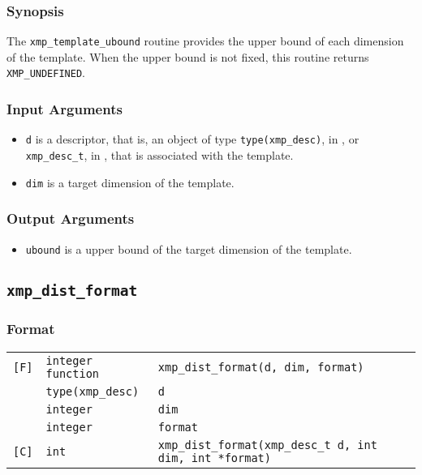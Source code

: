 \subsubsection*{Synopsis}

The {\tt xmp\_template\_ubound} routine provides the upper bound of each dimension of the template.
  When the upper bound is not fixed, this routine returns {\tt XMP\_UNDEFINED}.

\subsubsection*{Input Arguments}
\begin{itemize}
 \item {\tt d} is a descriptor, that is, an object of type 
       {\tt type(xmp\_desc)}, in {\XMPF}, or {\tt xmp\_desc\_t},
       in {\XMPC}, that is associated with the template.
        \item {\tt dim} is a target dimension of the template.
\end{itemize}

\subsubsection*{Output Arguments}
\begin{itemize}
 \item {\tt ubound} is a upper bound of the target dimension of the template.
\end{itemize}


\subsection{\tt xmp\_dist\_format}

\subsubsection*{Format}

\begin{tabular}{lll}

\verb![F]!& {\tt integer function}& {\tt xmp\_dist\_format(d, dim, format)}\\
          & {\tt type(xmp\_desc)} & {\tt d}\\
          & {\tt integer} & {\tt dim}\\
          & {\tt integer} & {\tt format}\\

\verb![C]!&  {\tt int}& {\tt xmp\_dist\_format(xmp\_desc\_t d, int dim, int *format)}\\

\end{tabular}

